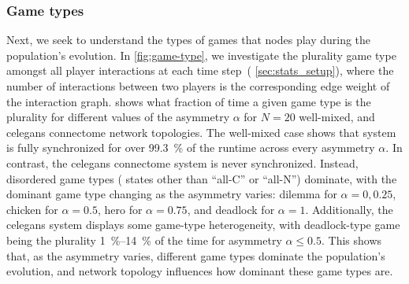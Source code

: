 \documentclass[pdflatex,twocolumn,sn-nature,super]{sn-jnl}
\begin{document}
\subsubsection{Game types}
\begin{figure*}
  \centering
  \begin{subcaptiongroup}
      {\label{fig:game-type_celegans-full}\captiontext*{}}{%
      {\label{fig:game-type_well-mixed}\captiontext*{}}{%
    {}%
  }}
  \end{subcaptiongroup}
  \caption{
    \textbf{
      The underlying game types explain the persistence
      and origins of chimera states.
    }
    The plurality game type amongst all player interactions
    (weighted by the interaction graph edge weight),
    expressed as a fraction of all games played,
    for different values of the asymmetry $\alpha$.
    The game types are color-coded according to the legend;
    additionally, ``all-C'' and ``all-N'' represent when the population
    is entirely synchronized to communicativeness or non-communicativeness, respectively.
    The network topologies are the
    $N=20$ well-mixed population
    and
    weighted, directed \gls{celegans} connectome.
    The selection strength is $\delta=0.2$,
    the mutation rate is $\mu=\num{1E-4}$,
    the cost $c$ is \num{0.1},
    $B_0$ is \num{0.15},
    $\beta_0$ is $\num{0.95} B_0$,
    and the simulation ran for \num{8E6} time steps.
  }\label{fig:game-type}
\end{figure*}

Next, we seek to understand the types of games
that nodes play during the population's evolution.
In \cref{fig:game-type}, we investigate the plurality game type
amongst all player interactions at each time step~(\cf{} \cref{sec:stats_setup}),
where the number of interactions between two players
is the corresponding edge weight of the interaction graph.
 shows what fraction of time
a given game type is the plurality for different values
of the asymmetry $\alpha$ for
$N=20$ well-mixed,
and
\gls{celegans} connectome
network topologies.
The  well-mixed case
shows that system is fully synchronized
for over \SI{99.3}{\percent} of the runtime
across every asymmetry $\alpha$.
In contrast, the
 \gls{celegans} connectome system
is never synchronized.
Instead, disordered game types (\ie{} states other than ``all-C'' or ``all-N'')
dominate,
with the dominant game type changing as the asymmetry varies:
dilemma for $\alpha = 0, 0.25$, chicken for $\alpha = 0.5$,
hero for $\alpha = 0.75$, and deadlock for $\alpha = 1$.
Additionally, the \gls{celegans} system displays
some game-type heterogeneity, with
deadlock-type game being the plurality
\SIrange{1}{14}{\percent} of the time
for asymmetry $\alpha \le 0.5$.
This shows that, as the asymmetry varies,
different game types dominate the population's evolution,
and network topology influences how dominant these game types are.
\end{document}
